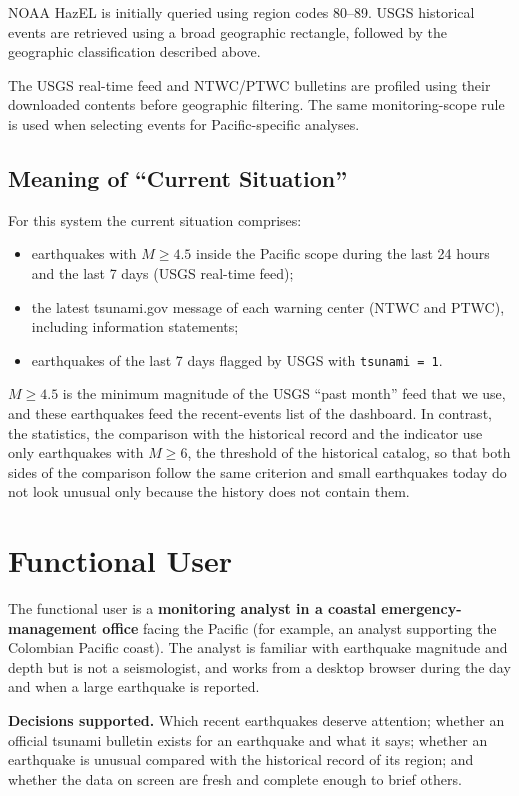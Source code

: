 \documentclass[a4paper,11pt,oneside]{book}
\begin{document}
NOAA HazEL is initially queried using region codes 80--89.
USGS historical events are retrieved using a broad geographic
rectangle, followed by the geographic classification described
above.

The USGS real-time feed and NTWC/PTWC bulletins are profiled
using their downloaded contents before geographic filtering.
The same monitoring-scope rule is used when selecting events
for Pacific-specific analyses.

\subsection{Meaning of ``Current Situation''}
For this system the current situation comprises:
\begin{itemize}[nosep]
  \item earthquakes with $M \geq 4.5$ inside the Pacific scope during the last 24 hours and the last 7 days (USGS real-time feed);
  \item the latest tsunami.gov message of each warning center (NTWC and PTWC), including information statements;
  \item earthquakes of the last 7 days flagged by USGS with \texttt{tsunami = 1}.
\end{itemize}
$M \geq 4.5$ is the minimum magnitude of the USGS ``past month'' feed that we use, and these earthquakes feed the recent-events list of the dashboard.
In contrast, the statistics, the comparison with the historical record and the indicator use only earthquakes with $M \geq 6$, the threshold of the historical catalog, so that both sides of the comparison follow the same criterion and small earthquakes today do not look unusual only because the history does not contain them.

\section{Functional User}
The functional user is a \textbf{monitoring analyst in a coastal emergency-management office} facing the Pacific (for example, an analyst supporting the Colombian Pacific coast).
The analyst is familiar with earthquake magnitude and depth but is not a seismologist, and works from a desktop browser during the day and when a large earthquake is reported.

\textbf{Decisions supported.} Which recent earthquakes deserve attention; whether an official tsunami bulletin exists for an earthquake and what it says; whether an earthquake is unusual compared with the historical record of its region; and whether the data on screen are fresh and complete enough to brief others.
\end{document}
